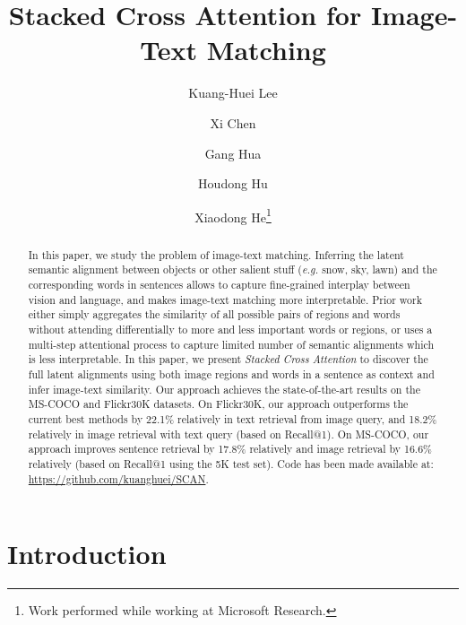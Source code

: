 \documentclass[runningheads]{llncs}
\begin{document}
\title{Stacked Cross Attention for \newline Image-Text Matching} 


\author{Kuang-Huei Lee \and Xi Chen \and Gang Hua \and Houdong Hu \and Xiaodong He\thanks{Work performed while working at Microsoft Research.}}


\maketitle              \begin{abstract}
In this paper, we study the problem of image-text matching. Inferring the latent semantic alignment between objects or other salient stuff ({\em e.g.} snow, sky, lawn) and the corresponding words in sentences allows to capture fine-grained interplay between vision and language, and makes image-text matching more interpretable. Prior work either simply aggregates the similarity of all possible pairs of regions and words without attending differentially to more and less important words or regions, or uses a multi-step attentional process to capture limited number of semantic alignments which is less interpretable. In this paper, we present \textit{Stacked Cross Attention} to discover the full latent alignments using both image regions and words in a sentence as context and infer image-text similarity. Our approach achieves the state-of-the-art results on the MS-COCO and Flickr30K datasets. On Flickr30K, our approach outperforms the current best methods by 22.1\% relatively in text retrieval from image query, and 18.2\% relatively in image retrieval with text query (based on Recall@1). On MS-COCO, our approach improves sentence retrieval by 17.8\% relatively and image retrieval by 16.6\% relatively (based on Recall@1 using the 5K test set). Code has been made available at: \url{https://github.com/kuanghuei/SCAN}.

\end{abstract}
\section{Introduction}
\end{document}
